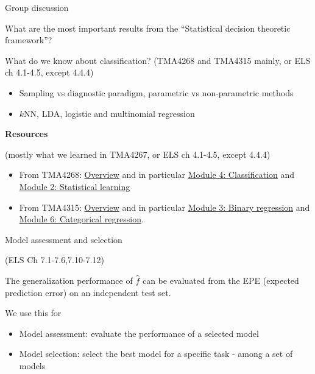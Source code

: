 \documentclass[
  ignorenonframetext,
]{beamer}
\providecommand{\tightlist}{%
  \setlength{\itemsep}{0pt}\setlength{\parskip}{0pt}}
\begin{document}
\begin{frame}

\begin{block}{Group discussion}

What are the most important results from the ``Statistical decision
theoretic framework''?

What do we know about classification? (TMA4268 and TMA4315 mainly, or
ELS ch 4.1-4.5, except 4.4.4)

\begin{itemize}
\tightlist
\item
  Sampling vs diagnostic paradigm, parametric vs non-parametric methods
\item
  \(k\)NN, LDA, logistic and multinomial regression
\end{itemize}

\end{block}

\end{frame}

\begin{frame}

\textbf{Resources}

(mostly what we learned in TMA4267, or ELS ch 4.1-4.5, except 4.4.4)

\begin{itemize}
\tightlist
\item
  From TMA4268:
  \href{https://www.math.ntnu.no/emner/TMA4268/2019v/TMA4268overview.html}{Overview}
  and in particular
  \href{https://www.math.ntnu.no/emner/TMA4268/2019v/4Classif/4Classif.html}{Module
  4: Classification} and
  \href{https://www.math.ntnu.no/emner/TMA4268/2019v/2StatLearn/2StatLearn.html\#k-nearest_neighbour_classifier}{Module
  2: Statistical learning}
\item
  From TMA4315:
  \href{https://www.math.ntnu.no/emner/TMA4315/2018h/TMA4315overviewH2018.html}{Overview}
  and in particular
  \href{https://www.math.ntnu.no/emner/TMA4315/2018h/3BinReg.html}{Module
  3: Binary regression} and
  \href{https://www.math.ntnu.no/emner/TMA4315/2018h/6Categorical.html}{Module
  6: Categorical regression}.
\end{itemize}

\end{frame}

\begin{frame}{Model assessment and selection}
\protect\hypertarget{model-assessment-and-selection}{}

(ELS Ch 7.1-7.6,7.10-7.12)

The generalization performance of \(\hat{f}\) can be evaluated from the
EPE (expected prediction error) on an independent test set.

We use this for

\begin{itemize}
\tightlist
\item
  Model assessment: evaluate the performance of a selected model
\item
  Model selection: select the best model for a specific task - among a
  set of models
\end{itemize}

\end{frame}
\end{document}
